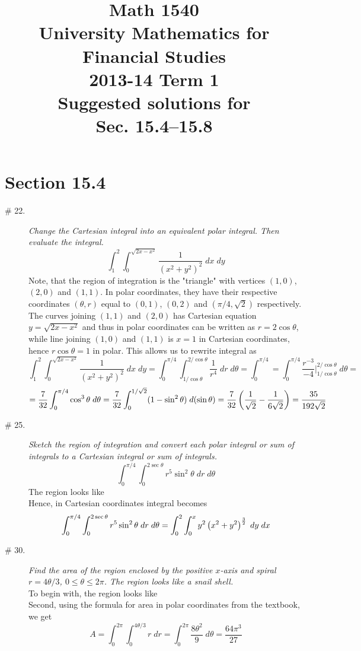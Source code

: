 \documentclass[8pt]{article} %
\title{Math 1540\\University Mathematics for Financial Studies\\2013-14 Term 1\\Suggested solutions for\\
Sec. 15.4--15.8}
\newcommand{\dx}{\;dx}
\newcommand{\dy}{\;dy}
\newcommand{\dr}{\;dr}
\newcommand{\dt}{\;d\theta}
\begin{document}
\maketitle
\section{Section 15.4}
\begin{description}
	\item[\# 22.]{{\it Change the Cartesian integral into an equivalent polar integral. Then evaluate the integral.}
		\[\int_1^2\int_0^{\sqrt{2x-x^2}}\frac{1}{(x^2+y^2)^2}\dx\dy\]
		Note, that the region of integration is the "triangle" with vertices $(1,0)$, $(2,0)$ and $(1,1)$. In polar 
		coordinates, they have their respective coordinates $(\theta,r)$ equal to $(0,1)$, $(0,2)$ and $(\pi/4,\sqrt{2})$
		respectively. The curves joining $(1,1)$ and $(2,0)$ has Cartesian equation $y=\sqrt{2x-x^2}$ and thus in
		polar coordinates can be written as $r=2\cos\theta$, while line joining $(1,0)$ and $(1,1)$ is
		$x=1$ in Cartesian coordinates, hence $r\cos\theta=1$ in polar. This allows us to rewrite integral as
		\[\int_1^2\int_0^{\sqrt{2x-x^2}}\frac{1}{(x^2+y^2)^2}\dx\dy=\int_0^{\pi/4}\int_{1/\cos\theta}^{2/\cos\theta}\frac{1}
		{r^4}\dr\dt=\int_0^{\pi/4}=\int_0^{\pi/4}\frac{r^{-3}}{-4}\bigg|_{1/\cos\theta}^{2/\cos\theta}\dt=\]
		\[=\frac{7}{32}\int_0^{\pi/4}\cos^3\theta\dt=\frac{7}{32}\int_0^{1/\sqrt{2}}(1-\sin^2\theta)\;d(\sin\theta)=
		\frac{7}{32}\mybra{\frac{1}{\sqrt{2}}-\frac{1}{6\sqrt{2}}}=\frac{35}{192\sqrt{2}}\]
		}
	\item[\# 25.]{{\it Sketch the region of integration and convert each polar integral or sum of integrals to a Cartesian
		integral or sum of integrals.}
		\[\int_0^{\pi/4}\int_0^{2\sec\theta}r^5\sin^2\theta\dr\dt\]
		The region looks like\\%
		Hence, in Cartesian coordinates integral becomes
		\[\int_0^{\pi/4}\int_0^{2\sec\theta}r^5\sin^2\theta\dr\dt=\int_0^2\int_0^xy^2\mybra{x^2+y^2}^{\frac{3}{2}}\dy\dx\]
		}
	\item[\# 30.]{{\it Find the area of the region enclosed by the positive $x$-axis and spiral $r=4\theta/3$, $0\leq\theta\leq
		2\pi$. The region looks like a snail shell.}\\
		To begin with, the region looks like\\%
		Second, using the formula for area in polar coordinates from the textbook, we get
		\[A=\int_0^{2\pi}\int_0^{4\theta/3}r\dr=\int_0^{2\pi}\frac{8\theta^2}{9}\dt=\frac{64\pi^3}{27}\]
		}

\end{description}
\end{document}
